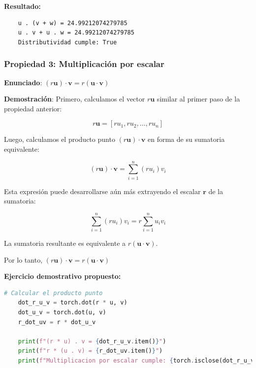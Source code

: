 \documentclass[12 pt]{article}
\begin{document}
\textbf{Resultado:}
\begin{lstlisting}
    u . (v + w) = 24.99212074279785
    u . v + u . w = 24.99212074279785
    Distributividad cumple: True
\end{lstlisting}


\subsubsection*{Propiedad 3: Multiplicación por escalar}

\begin{center}
\textbf{Enunciado}: \((r \mathbf{u}) \cdot \mathbf{v} = r (\mathbf{u} \cdot \mathbf{v})\)\\
\end{center}

\textbf{Demostración}: Primero, calculamos el vector \(r \mathbf{u}\) similar al primer paso de la propiedad anterior:

\[
r \mathbf{u} = [r u_1, r u_2, \dots, r u_n]
\]

Luego, calculamos el producto punto \((r \mathbf{u}) \cdot \mathbf{v}\) en forma de su sumatoria equivalente:

\[
(r \mathbf{u}) \cdot \mathbf{v} = \sum_{i=1}^{n} (r u_i) v_i
\]

Esta expresión puede desarrollarse aún más extrayendo el escalar \(\mathbf{r}\) de la sumatoria:

\[
\sum_{i=1}^{n} (r u_i) v_i = r \sum_{i=1}^{n} u_i v_i
\]

La sumatoria resultante es equivalente a \(r (\mathbf{u} \cdot \mathbf{v})\).

\begin{center}
Por lo tanto, \((r \mathbf{u}) \cdot \mathbf{v} = r (\mathbf{u} \cdot \mathbf{v})\)\\
\end{center}

\textbf{Ejercicio demostrativo propuesto:}
\begin{lstlisting}[language=Python]
    # Calcular el producto punto
    dot_r_u_v = torch.dot(r * u, v)
    dot_u_v = torch.dot(u, v)
    r_dot_uv = r * dot_u_v
    
    print(f"(r * u) . v = {dot_r_u_v.item()}")
    print(f"r * (u . v) = {r_dot_uv.item()}")
    print(f"Multiplicacion por escalar cumple: {torch.isclose(dot_r_u_v, r_dot_uv)}")
\end{lstlisting}
\end{document}
